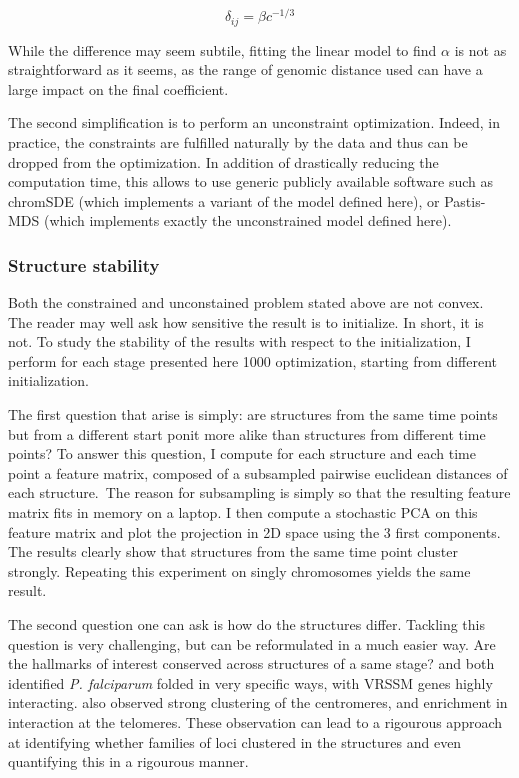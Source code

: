 \documentclass[letterpaper,12pt]{article}
\begin{document}
\begin{equation}
\delta_{ij} = \beta c^{-1/3}
\end{equation}

While the difference may seem subtile, fitting the linear model to find
$\alpha$ is not as straightforward as it seems, as the range of genomic
distance used can have a large impact on the final coefficient.

The second simplification is to perform an unconstraint optimization. Indeed,
in practice, the constraints are fulfilled naturally by the data and thus can
be dropped from the optimization. In addition of drastically reducing the
computation time, this allows to use generic publicly available software such
as chromSDE (which implements a variant of the model defined here), or
Pastis-MDS (which implements exactly the unconstrained model defined here).

\subsubsection{Structure stability}

Both the constrained and unconstained problem stated above are not convex. The
reader may well ask how sensitive the result is to initialize. In short, it is
not. To study the stability of the results with respect to the initialization,
I perform for each stage presented here 1000 optimization, starting from
different initialization. 

The first question that arise is simply: are structures from the same time
points but from a different start ponit more alike than structures from
different time points? To answer this question, I compute for each structure
and each time point a feature matrix, composed of a subsampled pairwise
euclidean distances of each structure. The reason for subsampling is simply so
that the resulting feature matrix fits in memory on a laptop. I then compute a
stochastic PCA on this feature matrix and plot the projection in 2D space
using the 3 first components. The results clearly show that structures from
the same time point cluster strongly. Repeating this experiment on singly
chromosomes yields the same result.

The second question one can ask is how do the structures differ. Tackling this
question is very challenging, but can be reformulated in a much easier way.
Are the hallmarks of interest conserved across structures of a same stage?
\citet{ay:three-dimensional} and \citet{lemieux:genome-wide} both identified
{\em P. falciparum} folded in very specific ways, with VRSSM genes highly
interacting. \citet{ay:three-dimensional} also observed strong clustering of
the centromeres, and enrichment in interaction at the telomeres. These
observation can lead to a rigourous approach at identifying whether families
of loci clustered in the structures and even quantifying this in a rigourous
manner.
\end{document}
